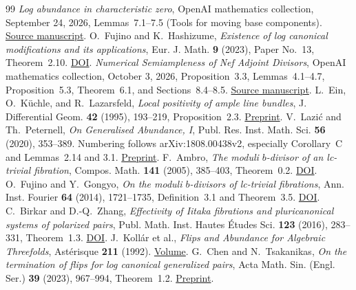 \documentclass[12pt,a4paper,psamsfonts]{amsart}
\theoremstyle{definition}
\theoremstyle{plain}
\begin{document}
\begin{thebibliography}{99}
\emph{Log abundance in characteristic zero},
OpenAI mathematics collection, September 24, 2026,
Lemmas~7.1--7.5 (Tools for moving base components).
\href{https://github.com/openai/math/blob/main/preprints/Log-abundance-in-characteristic-zero-September-24-2026/paper.pdf}{Source manuscript}.
O.~Fujino and K.~Hashizume,
\emph{Existence of log canonical modifications and its applications},
Eur. J. Math. \textbf{9} (2023), Paper No.~13, Theorem~2.10.
\href{https://doi.org/10.1007/s40879-023-00598-0}{DOI}.
\emph{Numerical Semiampleness of Nef Adjoint Divisors},
OpenAI mathematics collection, October 3, 2026,
Proposition~3.3, Lemmas~4.1--4.7, Proposition~5.3,
Theorem~6.1, and Sections~8.4--8.5.
\href{https://github.com/openai/math/blob/main/preprints/Numerical-Semiampleness-of-Nef-Adjoint-Divisors-October-3-2026/paper.pdf}{Source manuscript}.
L.~Ein, O.~K\"uchle, and R.~Lazarsfeld,
\emph{Local positivity of ample line bundles},
J. Differential Geom. \textbf{42} (1995), 193--219, Proposition~2.3.
\href{https://arxiv.org/pdf/alg-geom/9408003}{Preprint}.
V.~Lazi\'c and Th.~Peternell,
\emph{On Generalised Abundance, I},
Publ. Res. Inst. Math. Sci. \textbf{56} (2020), 353--389.
Numbering follows arXiv:1808.00438v2, especially Corollary~C
and Lemmas~2.14 and 3.1.
\href{https://arxiv.org/pdf/1808.00438}{Preprint}.
F.~Ambro,
\emph{The moduli $b$-divisor of an lc-trivial fibration},
Compos. Math. \textbf{141} (2005), 385--403, Theorem~0.2.
\href{https://doi.org/10.1112/S0010437X04001071}{DOI}.
O.~Fujino and Y.~Gongyo,
\emph{On the moduli $b$-divisors of lc-trivial fibrations},
Ann. Inst. Fourier \textbf{64} (2014), 1721--1735,
Definition~3.1 and Theorem~3.5.
\href{https://doi.org/10.5802/aif.2894}{DOI}.
C.~Birkar and D.-Q.~Zhang,
\emph{Effectivity of Iitaka fibrations and pluricanonical
systems of polarized pairs},
Publ. Math. Inst. Hautes \'Etudes Sci. \textbf{123} (2016),
283--331, Theorem~1.3.
\href{https://doi.org/10.1007/s10240-016-0080-x}{DOI}.
J.~Koll\'ar et al.,
\emph{Flips and Abundance for Algebraic Threefolds},
Ast\'erisque \textbf{211} (1992).
\href{https://www.numdam.org/item/AST_1992__211__1_0/}{Volume}.
G.~Chen and N.~Tsakanikas,
\emph{On the termination of flips for log canonical generalized pairs},
Acta Math. Sin. (Engl. Ser.) \textbf{39} (2023), 967--994,
Theorem~1.2.
\href{https://arxiv.org/pdf/2011.02236}{Preprint}.

\end{thebibliography}
\end{document}

